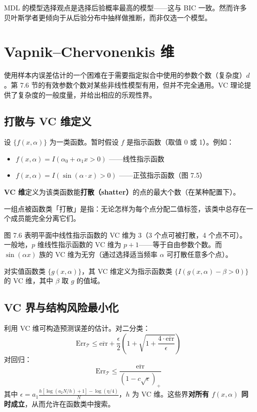MDL 的模型选择观点是选择后验概率最高的模型——这与 BIC 一致。然而许多贝叶斯学者更倾向于从后验分布中抽样做推断，而非仅选一个模型。

\section{Vapnik--Chervonenkis 维}

使用样本内误差估计的一个困难在于需要指定拟合中使用的参数个数（复杂度）$d$。第 7.6 节的有效参数个数对某些非线性模型有用，但并不完全通用。VC 理论提供了复杂度的一般度量，并给出相应的乐观性界。

\subsection{打散与 VC 维定义}

设 $\{f(x, \alpha)\}$ 为一类函数。暂时假设 $f$ 是指示函数（取值 0 或 1）。例如：
\begin{itemize}
    \item $f(x, \alpha) = I(\alpha_0 + \alpha_1 x > 0)$ ——线性指示函数
    \item $f(x, \alpha) = I(\sin(\alpha\cdot x) > 0)$ ——正弦指示函数（图 7.5）
\end{itemize}

\textbf{VC 维}定义为该类函数能\textbf{打散（shatter）}的点的最大个数（在某种配置下）。

一组点被函数类「打散」是指：无论怎样为每个点分配二值标签，该类中总存在一个成员能完全分离它们。

图 7.6 表明平面中线性指示函数的 VC 维为 3（3 个点可被打散，4 个点不可）。一般地，$p$ 维线性指示函数的 VC 维为 $p+1$——等于自由参数个数。而 $\sin(\alpha x)$ 族的 VC 维为无穷（通过选择适当频率 $\alpha$ 可打散任意多个点）。

对实值函数类 $\{g(x, \alpha)\}$，其 VC 维定义为指示函数类 $\{I(g(x, \alpha) - \beta > 0)\}$ 的 VC 维，其中 $\beta$ 取 $g$ 的值域。

\subsection{VC 界与结构风险最小化}

利用 VC 维可构造预测误差的估计。对二分类：
\begin{equation}\label{eq:VC_bound_class}
    \mathrm{Err}_{\mathcal{T}} \leq \overline{\mathrm{err}} + \frac{\epsilon}{2}\left(1 + \sqrt{1 + \frac{4\cdot\overline{\mathrm{err}}}{\epsilon}}\right)
\end{equation}
对回归：
\begin{equation}\label{eq:VC_bound_reg}
    \mathrm{Err}_{\mathcal{T}} \leq \frac{\overline{\mathrm{err}}}{(1 - c\sqrt{\epsilon})_+}
\end{equation}
其中 $\epsilon = a_1\frac{h[\log(a_2 N/h) + 1] - \log(\eta/4)}{N}$，$h$ 为 VC 维。这些界\textbf{对所有 $f(x, \alpha)$ 同时成立}，从而允许在函数类中搜索。

